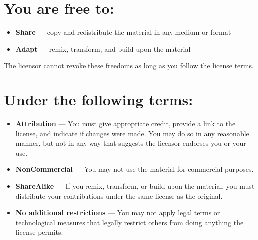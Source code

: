 \begin{tcolorbox}[
    colback=white,
    boxrule=0.5pt,
    fontupper=\scriptsize,
    before upper={\parindent0pt\setlength{\parskip}{2pt}}, %
    after upper={\vspace{-3mm}}, %
    width=\textwidth,
    top=7pt,
    bottom=7pt,
    left=4pt,
    right=4pt,
]
\section*{\scriptsize\bfseries You are free to:}
\vspace{-\baselineskip} %
\begin{itemize}[itemsep=1pt,topsep=2pt,leftmargin=18pt,partopsep=0pt]
    \item \textbf{Share} — copy and redistribute the material in any medium or format
    \item \textbf{Adapt} — remix, transform, and build upon the material
\end{itemize}

The licensor cannot revoke these freedoms as long as you follow the license terms.

\vspace{-4mm} %
\section*{\scriptsize\bfseries Under the following terms:}
\vspace{-\baselineskip} %
\begin{itemize}[itemsep=1pt,topsep=2pt,leftmargin=18pt,partopsep=0pt]
    \item \textbf{Attribution} — You must give \href{https://creativecommons.org/licenses/by/4.0/#ref-appropriate-credit}{appropriate credit}, provide a link to the license, and \href{https://creativecommons.org/licenses/by/4.0/#ref-indicate-changes}{indicate if changes were made}. You may do so in any reasonable manner, but not in any way that suggests the licensor endorses you or your use.
    \item \textbf{NonCommercial} — You may not use the material for commercial purposes.
    \item \textbf{ShareAlike} — If you remix, transform, or build upon the material, you must distribute your contributions under the same license as the original.
    \item \textbf{No additional restrictions} — You may not apply legal terms or \href{https://creativecommons.org/licenses/by/4.0/#ref-technological-measures}{technological measures} that legally restrict others from doing anything the license permits.
\end{itemize}


\end{tcolorbox}
